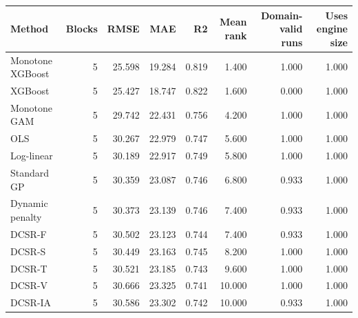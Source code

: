 \begin{tabular}{lrrrrrrr}
\toprule
Method & Blocks & RMSE & MAE & R2 & Mean rank & Domain-valid runs & Uses engine size \\
\midrule
Monotone XGBoost & 5 & 25.598 & 19.284 & 0.819 & 1.400 & 1.000 & 1.000 \\
XGBoost & 5 & 25.427 & 18.747 & 0.822 & 1.600 & 0.000 & 1.000 \\
Monotone GAM & 5 & 29.742 & 22.431 & 0.756 & 4.200 & 1.000 & 1.000 \\
OLS & 5 & 30.267 & 22.979 & 0.747 & 5.600 & 1.000 & 1.000 \\
Log-linear & 5 & 30.189 & 22.917 & 0.749 & 5.800 & 1.000 & 1.000 \\
Standard GP & 5 & 30.359 & 23.087 & 0.746 & 6.800 & 0.933 & 1.000 \\
Dynamic penalty & 5 & 30.373 & 23.139 & 0.746 & 7.400 & 0.933 & 1.000 \\
DCSR-F & 5 & 30.502 & 23.123 & 0.744 & 7.400 & 0.933 & 1.000 \\
DCSR-S & 5 & 30.449 & 23.163 & 0.745 & 8.200 & 1.000 & 1.000 \\
DCSR-T & 5 & 30.521 & 23.185 & 0.743 & 9.600 & 1.000 & 1.000 \\
DCSR-V & 5 & 30.666 & 23.325 & 0.741 & 10.000 & 1.000 & 1.000 \\
DCSR-IA & 5 & 30.586 & 23.302 & 0.742 & 10.000 & 0.933 & 1.000 \\
\bottomrule
\end{tabular}
